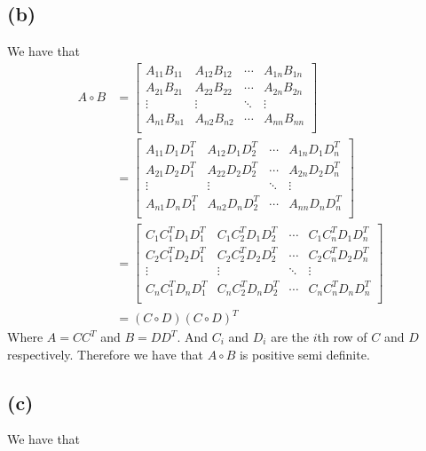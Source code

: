 \documentclass[11pt]{article}
\begin{document}
\subsection*{(b)}
We have that 
\begin{align*}
    A \circ B & =\begin{bmatrix}
        A_{11} B_{11} & A_{12} B_{12} & \cdots & A_{1n} B_{1n}\\
        A_{21} B_{21} & A_{22} B_{22} & \cdots & A_{2n} B_{2n}\\
        \vdots & \vdots & \ddots & \vdots\\
        A_{n1} B_{n1} & A_{n2} B_{n2} & \cdots & A_{nn} B_{nn}\\
    \end{bmatrix}\\
    &= \begin{bmatrix}
        A_{11} D_{1} D_{1}^T & A_{12} D_{1} D_{2}^T & \cdots & A_{1n} D_{1} D_{n}^T\\
        A_{21} D_{2} D_{1}^T & A_{22} D_{2} D_{2}^T & \cdots & A_{2n} D_{2} D_{n}^T\\
        \vdots & \vdots & \ddots & \vdots\\
        A_{n1} D_{n} D_{1}^T & A_{n2} D_{n} D_{2}^T & \cdots & A_{nn} D_{n} D_{n}^T\\
    \end{bmatrix}\\
    &= \begin{bmatrix}
        C_{1}C_{1}^T D_{1} D_{1}^T & C_{1}C_{2}^T D_{1} D_{2}^T & \cdots & C_{1}C_{n}^T D_{1} D_{n}^T\\
        C_{2}C_{1}^T D_{2} D_{1}^T & C_{2}C_{2}^T D_{2} D_{2}^T & \cdots & C_{2}C_{n}^T D_{2} D_{n}^T\\
        \vdots & \vdots & \ddots & \vdots\\
        C_{n}C_{1}^T D_{n} D_{1}^T & C_{n}C_{2}^T D_{n} D_{2}^T & \cdots & C_{n}C_{n}^T D_{n} D_{n}^T\\
    \end{bmatrix}\\
    &=(C\circ D) (C\circ D)^T
\end{align*}
Where $A=CC^T$ and $B=DD^T$. And $C_{i}$ and $D_{i}$ are the $i$th row of $C$ and $D$ respectively. Therefore we have that $A \circ B$ is positive semi definite.
\subsection*{(c)}
We have that 
\end{document}
